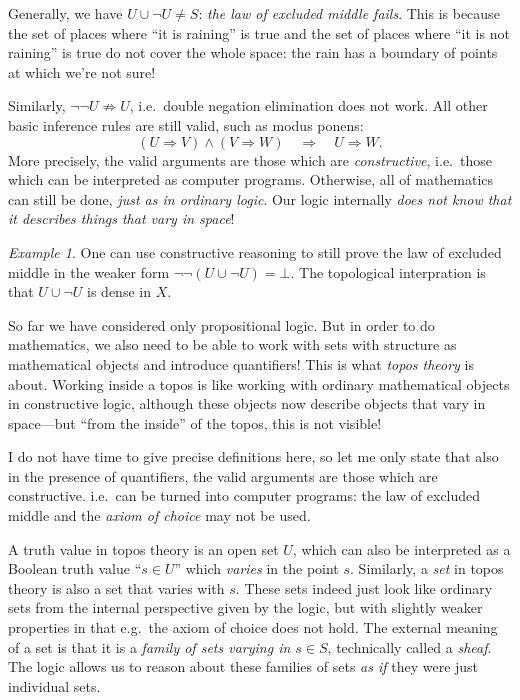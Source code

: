 \documentclass[11pt, oneside, article]{memoir}
\theoremstyle{plain}
\theoremstyle{definition}
\theoremstyle{remark}
\newtheorem{example}[theorem]{Example}
\begin{document}
Generally, we have $U \cup \lnot U \neq S$: \emph{the law of excluded middle fails}. This is because the set of places where ``it is raining'' is true and the set of places where ``it is not raining'' is true do not cover the whole space: the rain has a boundary of points at which we're not sure!

Similarly, $\lnot\lnot U \not\Rightarrow U$, i.e.~double negation elimination does not work. All other basic inference rules are still valid, such as modus ponens: 
\[
	(U \Rightarrow V) \land (V\Rightarrow W) \quad \Rightarrow \quad U \Rightarrow W.
\]
More precisely, the valid arguments are those which are \emph{constructive}, i.e.~those which can be interpreted as computer programs. Otherwise, all of mathematics can still be done, \emph{just as in ordinary logic}. Our logic internally \emph{does not know that it describes things that vary in space}!

\begin{example}
One can use constructive reasoning to still prove the law of excluded middle in the weaker form $\lnot\lnot(U \cup \lnot U) = \bot$. The topological interpration is that $U \cup \lnot U$ is dense in $X$.
\end{example}

So far we have considered only propositional logic. But in order to do mathematics, we also need to be able to work with sets with structure as mathematical objects and introduce quantifiers! This is what \emph{topos theory} is about. Working inside a topos is like working with ordinary mathematical objects in constructive logic, although these objects now describe objects that vary in space---but ``from the inside'' of the topos, this is not visible!

I do not have time to give precise definitions here, so let me only state that also in the presence of quantifiers, the valid arguments are those which are constructive. i.e.~can be turned into computer programs: the law of excluded middle and the \emph{axiom of choice} may not be used.

A truth value in topos theory is an open set $U$, which can also be interpreted as a Boolean truth value ``$s\in U$'' which \emph{varies} in the point $s$. Similarly, a \emph{set} in topos theory is also a set that varies with $s$. These sets indeed just look like ordinary sets from the internal perspective given by the logic, but with slightly weaker properties in that e.g.~the axiom of choice does not hold. The external meaning of a set is that it is a \emph{family of sets varying in $s\in S$}, technically called a \emph{sheaf}. The logic allows us to reason about these families of sets \emph{as if} they were just individual sets.
\end{document}
